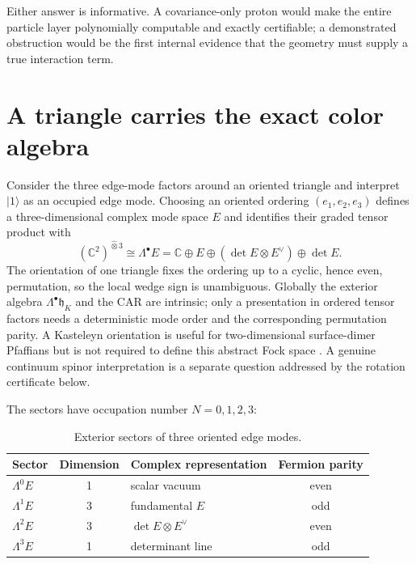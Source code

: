 \documentclass[11pt,letterpaper]{article}
\newcommand{\hh}{\mathfrak{h}}
\newcommand{\gtens}{\mathbin{\widehat{\otimes}}}
\begin{document}
Either answer is informative. A covariance-only proton would make the entire
particle layer polynomially computable and exactly certifiable; a demonstrated
obstruction would be the first internal evidence that the geometry must supply
a true interaction term.

\section{A triangle carries the exact color algebra}\label{sec:triangle}

Consider the three edge-mode factors around an oriented triangle and interpret
$\lvert 1\rangle$ as an occupied edge mode. Choosing an oriented ordering
$(e_1,e_2,e_3)$ defines a three-dimensional complex mode space $E$ and
identifies their graded tensor product with
\begin{equation*}
  (\mathbb C^2)^{\gtens3}\cong\Lambda^\bullet E
  =\mathbb C\oplus E\oplus(\det E\otimes E^\vee)\oplus\det E .
\end{equation*}
The orientation of one triangle fixes the ordering up to a cyclic, hence even,
permutation, so the local wedge sign is unambiguous. Globally the exterior
algebra $\Lambda^{\bullet}\hh_{K}$ and the CAR are intrinsic; only a
presentation in ordered tensor factors needs a deterministic mode
order and the corresponding permutation parity. A Kasteleyn orientation is
useful for two-dimensional surface-dimer Pfaffians but is not required to
define this abstract Fock space \cite{cimasonireshetikhin2007}. A genuine
continuum spinor interpretation is a separate question addressed by the
rotation certificate below.

The sectors have occupation number $N=0,1,2,3$:

\begin{table}[htb]
\centering
\begin{tabular}{lclc}
\toprule
Sector & Dimension & Complex representation & Fermion parity\\
\midrule
$\Lambda^0E$ & 1 & scalar vacuum & even\\
$\Lambda^1E$ & 3 & fundamental $E$ & odd\\
$\Lambda^2E$ & 3 & $\det E\otimes E^\vee$ & even\\
$\Lambda^3E$ & 1 & determinant line & odd\\
\bottomrule
\end{tabular}
\caption{Exterior sectors of three oriented edge modes.}
\label{tab:sectors}
\end{table}
\end{document}
